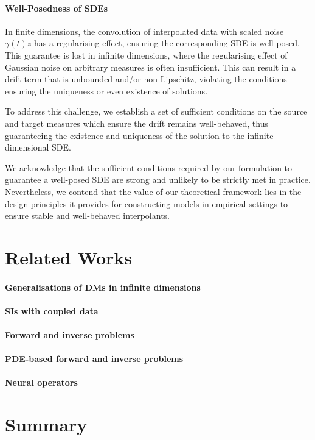 \paragraph{Well-Posedness of SDEs} In finite dimensions, the convolution of interpolated data with scaled noise \(\gamma(t)z\) has a regularising effect, ensuring the corresponding SDE is well-posed. This guarantee is lost in infinite dimensions, where the regularising effect of Gaussian noise on arbitrary measures is often insufficient. This can result in a drift term that is unbounded and/or non-Lipschitz, violating the conditions ensuring the uniqueness or even existence of solutions.

To address this challenge, we establish a set of sufficient conditions on the source and target measures which ensure the drift remains well-behaved, thus guaranteeing the existence and uniqueness of the solution to the infinite-dimensional SDE.

We acknowledge that the sufficient conditions required by our formulation to guarantee a well-posed SDE are strong and unlikely to be strictly met in practice. Nevertheless, we contend that the value of our theoretical framework lies in the design principles it provides for constructing models in empirical settings to ensure stable and well-behaved interpolants.

\section{Related Works}

\paragraph{Generalisations of DMs in infinite dimensions}

\paragraph{SIs with coupled data}
\paragraph{Forward and inverse problems}

\paragraph{PDE-based forward and inverse problems}

\paragraph{Neural operators}



\section{Summary}